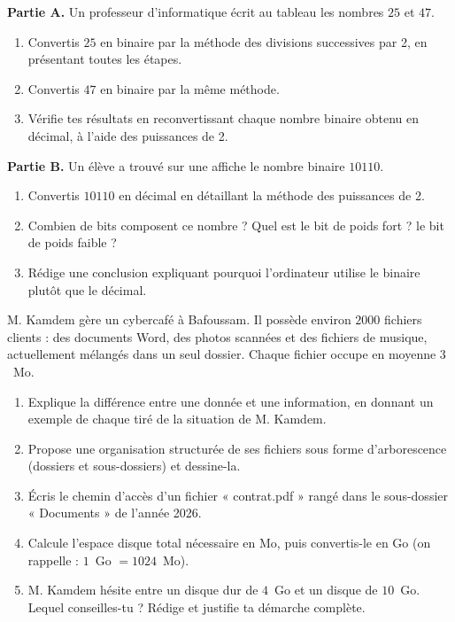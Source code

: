\documentclass[11pt]{article}
\newcounter{popsec}
\newcounter{popsub}
\newcommand{\courssub}[1]{%
  \stepcounter{popsub}%
  \par\vspace{9pt}\noindent{\popxbold\fontsize{11.5}{13}\selectfont\color{popink}{\color{poporange}\thepopsec.\thepopsub}\hspace{6pt}#1}\par\nopagebreak\vspace{4pt}
}
\begin{document}
\courssub{Je me prépare au Probatoire}

\begin{exercice}
\textbf{Partie A.} Un professeur d'informatique écrit au tableau les nombres $25$ et $47$.
\begin{enumerate}
\item Convertis $25$ en binaire par la méthode des divisions successives par 2, en présentant toutes les étapes.
\item Convertis $47$ en binaire par la même méthode.
\item Vérifie tes résultats en reconvertissant chaque nombre binaire obtenu en décimal, à l'aide des puissances de 2.
\end{enumerate}
\textbf{Partie B.} Un élève a trouvé sur une affiche le nombre binaire $10110$.
\begin{enumerate}
\item Convertis $10110$ en décimal en détaillant la méthode des puissances de 2.
\item Combien de bits composent ce nombre ? Quel est le bit de poids fort ? le bit de poids faible ?
\item Rédige une conclusion expliquant pourquoi l'ordinateur utilise le binaire plutôt que le décimal.
\end{enumerate}
\end{exercice}

\begin{exercice}
M. Kamdem gère un cybercafé à Bafoussam. Il possède environ $2000$ fichiers clients : des documents Word, des photos scannées et des fichiers de musique, actuellement mélangés dans un seul dossier. Chaque fichier occupe en moyenne $3$~Mo.
\begin{enumerate}
\item Explique la différence entre une donnée et une information, en donnant un exemple de chaque tiré de la situation de M. Kamdem.
\item Propose une organisation structurée de ses fichiers sous forme d'arborescence (dossiers et sous-dossiers) et dessine-la.
\item Écris le chemin d'accès d'un fichier « contrat.pdf » rangé dans le sous-dossier « Documents » de l'année 2026.
\item Calcule l'espace disque total nécessaire en Mo, puis convertis-le en Go (on rappelle : $1$~Go $= 1024$~Mo).
\item M. Kamdem hésite entre un disque dur de $4$~Go et un disque de $10$~Go. Lequel conseilles-tu ? Rédige et justifie ta démarche complète.
\end{enumerate}
\end{exercice}
\end{document}
